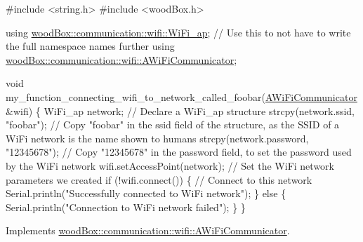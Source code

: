 \begin{DoxyCode}
\textcolor{preprocessor}{#include <string.h>}
\textcolor{preprocessor}{#include <woodBox.h>}

\textcolor{keyword}{using} \mbox{\hyperlink{structwood_box_1_1communication_1_1wifi_1_1s__wifi__access__point}{woodBox::communication::wifi::WiFi\_ap}}; \textcolor{comment}{// Use this to not have
       to write the full namespace names further}
\textcolor{keyword}{using} \mbox{\hyperlink{classwood_box_1_1communication_1_1wifi_1_1_a_wi_fi_communicator}{woodBox::communication::wifi::AWiFiCommunicator}};

\textcolor{keywordtype}{void} my\_function\_connecting\_wifi\_to\_network\_called\_foobar(\mbox{\hyperlink{classwood_box_1_1communication_1_1wifi_1_1_a_wi_fi_communicator_a9d1dc13ca9243170b04211bef2b86ed2}{AWiFiCommunicator}} &wifi) \{
  WiFi\_ap network; \textcolor{comment}{// Declare a WiFi\_ap structure}
  strcpy(network.ssid, \textcolor{stringliteral}{"foobar"}); \textcolor{comment}{// Copy "foobar" in the ssid field of the structure, as the SSID of a
       WiFi network is the name shown to humans}
  strcpy(network.password, \textcolor{stringliteral}{"12345678"}); \textcolor{comment}{// Copy "12345678" in the password field, to set the password used
       by the WiFi network}
  wifi.setAccessPoint(network); \textcolor{comment}{// Set the WiFi network parameters we created}
  \textcolor{keywordflow}{if} (!wifi.connect()) \{ \textcolor{comment}{// Connect to this network}
    Serial.println(\textcolor{stringliteral}{"Successfully connected to WiFi network"});
  \} \textcolor{keywordflow}{else} \{
    Serial.println(\textcolor{stringliteral}{"Connection to WiFi network failed"});
  \}
\}
\end{DoxyCode}
 

Implements \mbox{\hyperlink{classwood_box_1_1communication_1_1wifi_1_1_a_wi_fi_communicator_a7c4763c1594a4b934e5a39e90b271799}{wood\+Box\+::communication\+::wifi\+::\+A\+Wi\+Fi\+Communicator}}.

\mbox{\label{classwood_box_1_1communication_1_1wifi_1_1_e_s_p8266_wi_fi_communicator_a0875cf7209c48069d22270eaeb2cac0f}} 
